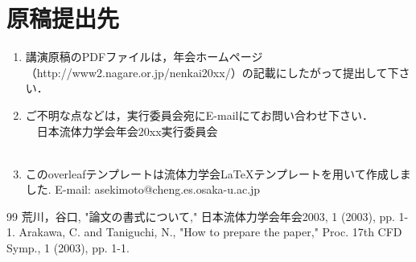 \documentclass[]{nenkai2019}
\begin{document}
\section{原稿提出先}
\begin{enumerate}
 \item[(1)] 講演原稿のPDFファイルは，年会ホームページ（http://www2.nagare.or.jp/nenkai20xx/）の記載にしたがって提出して下さい． 
 \item[(2)] ご不明な点などは，実行委員会宛にE-mailにてお問い合わせ下さい．\\　日本流体力学会年会20xx実行委員会\\　 
 \item[(3)] このoverleafテンプレートは流体力学会LaTeXテンプレートを用いて作成しました. E-mail: asekimoto@cheng.es.osaka-u.ac.jp 
\end{enumerate}

\begin{thebibliography}{99}
 荒川，谷口, "論文の書式について," 日本流体力学会年会2003, 1 (2003), pp. 1-1.
 Arakawa, C. and Taniguchi, N., "How to prepare the paper," Proc. 17th CFD Symp., 1 (2003), pp. 1-1.
\end{thebibliography}
\end{document}
